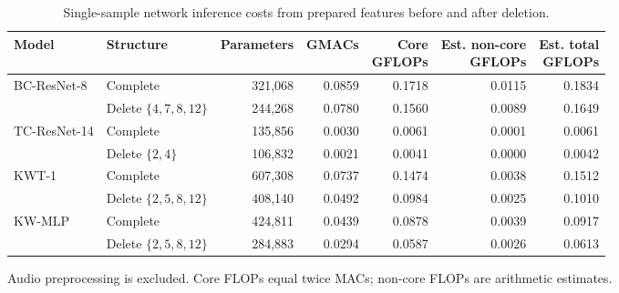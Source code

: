 \begin{table}[htbp]
\caption{Single-sample network inference costs from prepared features before and after deletion.}
\label{tab:inference_cost}
\centering\small
\setlength{\tabcolsep}{3pt}
\begin{tabular*}{\linewidth}{@{\extracolsep{\fill}}llrrrrr@{}}
\toprule
Model & Structure & Parameters & GMACs & \shortstack{Core\\GFLOPs} & \shortstack{Est. non-core\\GFLOPs} & \shortstack{Est. total\\GFLOPs} \\
\midrule
BC-ResNet-8 & Complete & 321,068 & 0.0859 & 0.1718 & 0.0115 & 0.1834 \\
 & Delete $\{4,7,8,12\}$ & 244,268 & 0.0780 & 0.1560 & 0.0089 & 0.1649 \\
\midrule
TC-ResNet-14 & Complete & 135,856 & 0.0030 & 0.0061 & 0.0001 & 0.0061 \\
 & Delete $\{2,4\}$ & 106,832 & 0.0021 & 0.0041 & 0.0000 & 0.0042 \\
\midrule
KWT-1 & Complete & 607,308 & 0.0737 & 0.1474 & 0.0038 & 0.1512 \\
 & Delete $\{2,5,8,12\}$ & 408,140 & 0.0492 & 0.0984 & 0.0025 & 0.1010 \\
\midrule
KW-MLP & Complete & 424,811 & 0.0439 & 0.0878 & 0.0039 & 0.0917 \\
 & Delete $\{2,5,8,12\}$ & 284,883 & 0.0294 & 0.0587 & 0.0026 & 0.0613 \\
\bottomrule
\end{tabular*}
\par\smallskip\begin{minipage}{\linewidth}\footnotesize
Audio preprocessing is excluded. Core FLOPs equal twice MACs; non-core FLOPs are arithmetic estimates.
\end{minipage}
\end{table}
